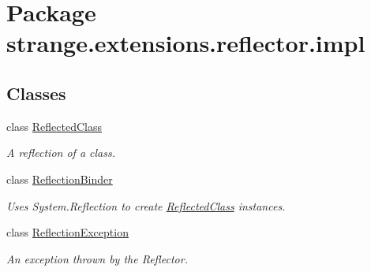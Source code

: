 \hypertarget{namespacestrange_1_1extensions_1_1reflector_1_1impl}{\section{Package strange.\-extensions.\-reflector.\-impl}
\label{namespacestrange_1_1extensions_1_1reflector_1_1impl}
}
\subsection*{Classes}
\begin{DoxyCompactItemize}
\item 
class \hyperlink{classstrange_1_1extensions_1_1reflector_1_1impl_1_1_reflected_class}{Reflected\-Class}
\begin{DoxyCompactList}\small\item\em A reflection of a class. \end{DoxyCompactList}\item 
class \hyperlink{classstrange_1_1extensions_1_1reflector_1_1impl_1_1_reflection_binder}{Reflection\-Binder}
\begin{DoxyCompactList}\small\item\em Uses System.\-Reflection to create {\ttfamily \hyperlink{classstrange_1_1extensions_1_1reflector_1_1impl_1_1_reflected_class}{Reflected\-Class}} instances. \end{DoxyCompactList}\item 
class \hyperlink{classstrange_1_1extensions_1_1reflector_1_1impl_1_1_reflection_exception}{Reflection\-Exception}
\begin{DoxyCompactList}\small\item\em An exception thrown by the Reflector. \end{DoxyCompactList}\end{DoxyCompactItemize}
